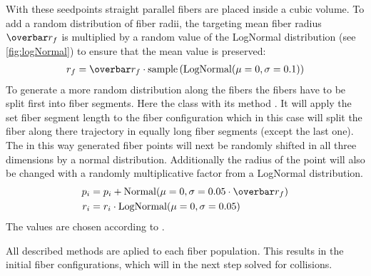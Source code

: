 % 
With these seedpoints straight parallel fibers are placed inside a cubic volume.
To add a random distribution of fiber radii, the targeting mean fiber radius $\fiberRadiusMean$ is multiplied by a random value of the LogNormal distribution (see \cref{fig:logNormal}) to ensure that the mean value is preserved:
\begin{align}
\fiberRadius = \fiberRadiusMean \cdot \mathrm{sample}\left(\mathrm{LogNormal}(\mu=0,\sigma=0.1)\right)
\end{align}
% 
To generate a more random distribution along the fibers the fibers have to be split first into fiber segments.
Here the  class with its method .
It will apply the set fiber segment length to the fiber configuration which in this case will split the fiber along there trajectory in equally long fiber segments (except the last one).
The in this way generated fiber points will next be randomly shifted in all three dimensions by a normal distribution.
Additionally the radius of the point will also be changed with a randomly multiplicative factor from a LogNormal distribution.
% 
\begin{align}
\begin{split}
p_i &= p_i + \mathrm{Normal}(\mu=0,\sigma=0.05 \cdot \fiberRadiusMean)\\
r_i &= r_i \cdot \mathrm{LogNormal}(\mu=0,\sigma=0.05)
\end{split}
\end{align}
% 
The values are chosen according to .
\par
%  
All described methods are aplied to each fiber population.
This results in the initial fiber configurations, which will in the next step solved for collisions.
% 
% 
% 
